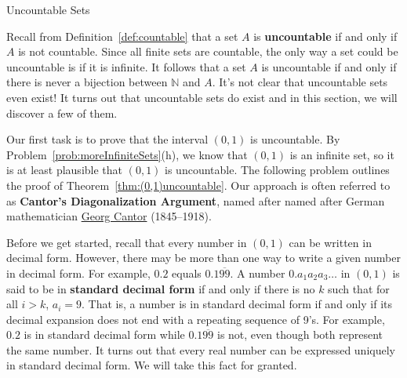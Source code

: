 \begin{section}{Uncountable Sets}

Recall from Definition~\ref{def:countable} that a set $A$ is \textbf{uncountable} if and only if $A$ is not countable.  Since all finite sets are countable, the only way a set could be uncountable is if it is infinite.  It follows that a set $A$ is uncountable if and only if there is never a bijection between $\mathbb{N}$ and $A$.  It's not clear that uncountable sets even exist!  It turns out that uncountable sets do exist and in this section, we will discover a few of them.

Our first task is to prove that the interval $(0,1)$ is uncountable.  By Problem~\ref{prob:moreInfiniteSets}(h), we know that $(0,1)$ is an infinite set, so it is at least plausible that $(0,1)$ is uncountable.  The following problem outlines the proof of Theorem~\ref{thm:(0,1)uncountable}.  Our approach is often referred to as \textbf{Cantor's Diagonalization Argument}, named after named after German mathematician \href{https://en.wikipedia.org/wiki/Georg_Cantor}{Georg Cantor} (1845--1918).

Before we get started, recall that every number in $(0,1)$ can be written in decimal form. However, there may be more than one way to write a given number in decimal form.  For example, $0.2$ equals $0.1\overline{99}$.  A number $0.a_1a_2a_3\ldots$ in $(0,1)$ is said to be in \textbf{standard decimal form} if and only if there is no $k$ such that for all $i>k$, $a_i=9$. That is, a number is in standard decimal form if and only if its decimal expansion does not end with a repeating sequence of 9's. For example, $0.2$ is in standard decimal form while $0.1\overline{99}$ is not, even though both represent the same number. It turns out that every real number can be expressed uniquely in standard decimal form. We will take this fact for granted.


\end{section}
